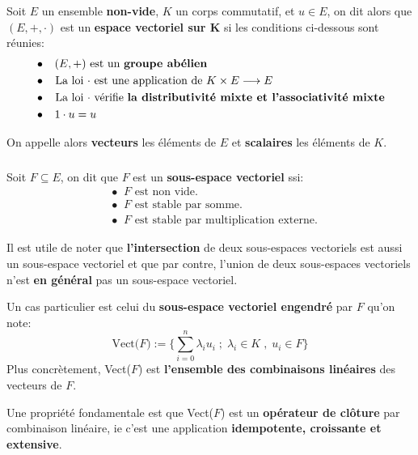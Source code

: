 \chapter*{}
Soit \(E\) un ensemble \textbf{non-vide}, \(K\) un corps commutatif, et \(u \in E\), on dit alors que \((E, +, \cdot)\) est un \textbf{espace vectoriel sur K} si les conditions ci-dessous sont réunies:
\begin{align*}
   &\bullet \;\;\; (E, +) \text{ est un \textbf{groupe abélien}} \\
   &\bullet \;\; \text{ La loi \(\cdot\) est une application de \(K \times E \longrightarrow E\)} \\
   &\bullet \;\; \text{ La loi \(\cdot\) vérifie \textbf{la distributivité mixte et l'associativité mixte}} \\
   &\bullet \;\;\; 1 \cdot u = u
\end{align*}

On appelle alors \textbf{vecteurs} les éléments de \(E\) et \textbf{scalaires} les éléments de \(K\).

\subsection*{}
Soit \(F \subseteq E\), on dit que \(F\) est un \textbf{sous-espace vectoriel} ssi:
\begin{align*}
   &\bullet \;\; F \text{ est non vide.} \\
   &\bullet \;\; F \text{ est stable par somme.} \\
   &\bullet \;\; F \text{ est stable par multiplication externe.}
\end{align*}

Il est utile de noter que \textbf{l'intersection} de deux sous-espaces vectoriels est aussi un sous-espace vectoriel et que par contre, l'union de deux sous-espaces vectoriels n'est \textbf{en général} pas un sous-espace vectoriel.\<

Un cas particulier est celui du \textbf{sous-espace vectoriel engendré} par \(F\) qu'on note:
\[
   \text{Vect(\(F\))} := \Biggl\{ \sum_{i=0}^{n} \lambda_i u_i\; ; \; \lambda_{i} \in K \; , \; u_{i} \in F \Biggl\}
\]
Plus concrètement, Vect(\(F\)) est \textbf{l'ensemble des combinaisons linéaires} des vecteurs de \(F\).\<

Une propriété fondamentale est que Vect(\(F\)) est un \textbf{opérateur de clôture} par combinaison linéaire, ie c'est une application \textbf{idempotente, croissante et extensive}.\<

